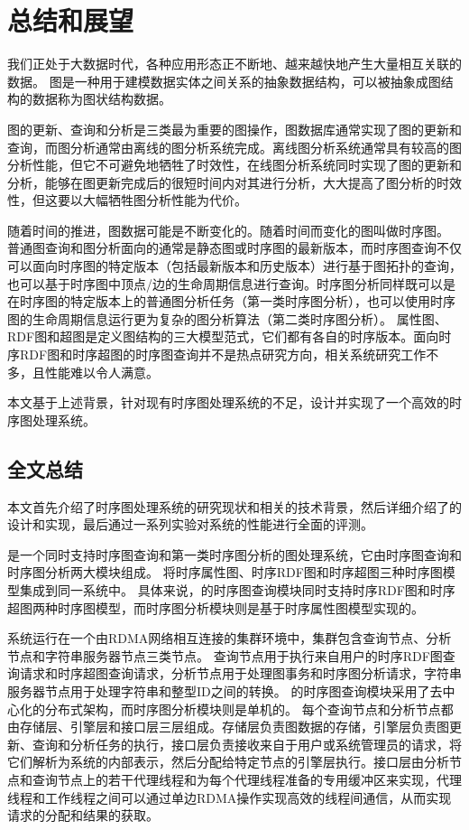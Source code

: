 
\chapter{总结和展望}
我们正处于大数据时代，各种应用形态正不断地、越来越快地产生大量相互关联的数据。
图是一种用于建模数据实体之间关系的抽象数据结构，可以被抽象成图结构的数据称为图状结构数据。

图的更新、查询和分析是三类最为重要的图操作，图数据库通常实现了图的更新和查询，而图分析通常由离线的图分析系统完成。离线图分析系统通常具有较高的图分析性能，但它不可避免地牺牲了时效性，在线图分析系统同时实现了图的更新和分析，能够在图更新完成后的很短时间内对其进行分析，大大提高了图分析的时效性，但这要以大幅牺牲图分析性能为代价。

随着时间的推进，图数据可能是不断变化的。随着时间而变化的图叫做时序图。
普通图查询和图分析面向的通常是静态图或时序图的最新版本，而时序图查询不仅可以面向时序图的特定版本（包括最新版本和历史版本）进行基于图拓扑的查询，也可以基于时序图中顶点/边的生命周期信息进行查询。时序图分析同样既可以是在时序图的特定版本上的普通图分析任务（第一类时序图分析），也可以使用时序图的生命周期信息运行更为复杂的图分析算法（第二类时序图分析）。
属性图、RDF图和超图是定义图结构的三大模型范式，它们都有各自的时序版本。面向时序RDF图和时序超图的时序图查询并不是热点研究方向，相关系统研究工作不多，且性能难以令人满意。

本文基于上述背景，针对现有时序图处理系统的不足，设计并实现了一个高效的时序图处理系统\sys。

\section{全文总结}
本文首先介绍了时序图处理系统的研究现状和相关的技术背景，然后详细介绍了\sys 的设计和实现，最后通过一系列实验对系统的性能进行全面的评测。

\sys 是一个同时支持时序图查询和第一类时序图分析的图处理系统，它由时序图查询和时序图分析两大模块组成。
\sys 将时序属性图、时序RDF图和时序超图三种时序图模型集成到同一系统中。
具体来说，\sys 的时序图查询模块同时支持时序RDF图和时序超图两种时序图模型，而时序图分析模块则是基于时序属性图模型实现的。

\sys 系统运行在一个由RDMA网络相互连接的集群环境中，集群包含查询节点、分析节点和字符串服务器节点三类节点。
查询节点用于执行来自用户的时序RDF图查询请求和时序超图查询请求，分析节点用于处理图事务和时序图分析请求，字符串服务器节点用于处理字符串和整型ID之间的转换。
\sys 的时序图查询模块采用了去中心化的分布式架构，而时序图分析模块则是单机的。
每个查询节点和分析节点都由存储层、引擎层和接口层三层组成。存储层负责图数据的存储，引擎层负责图更新、查询和分析任务的执行，接口层负责接收来自于用户或系统管理员的请求，将它们解析为系统的内部表示，然后分配给特定节点的引擎层执行。接口层由分析节点和查询节点上的若干代理线程和为每个代理线程准备的专用缓冲区来实现，代理线程和工作线程之间可以通过单边RDMA操作实现高效的线程间通信，从而实现请求的分配和结果的获取。

